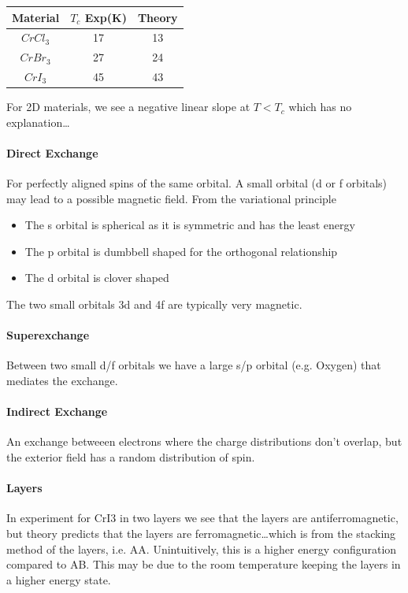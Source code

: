 \documentclass[../main.tex]{subfiles}
\begin{document}
\begin{center}
    \begin{tabular}{c|c|c}
        \hline
        Material & $T_c$ Exp(K) & Theory  \\
        \hline
        $CrCl_3$ & 17 & 13  \\
        $CrBr_3$ & 27 & 24  \\
        $CrI_3$ & 45 & 43 \\
        \hline
    \end{tabular}
\end{center}
For 2D materials, we see a negative linear slope at $T<T_c$ which has no explanation\dots

\paragraph*{Direct Exchange} For perfectly aligned spins of the same orbital. A small orbital (d or f orbitals) may lead to a possible magnetic
field. From the variational principle
\begin{itemize}
    \item The s orbital is spherical as it is symmetric and has the least energy
    \item The p orbital is dumbbell shaped for the orthogonal relationship
    \item The d orbital is clover shaped 
\end{itemize} 
The two small orbitals 3d and 4f are typically very magnetic. 

\paragraph*{Superexchange}
Between two small d/f orbitals we have a large s/p orbital (e.g. Oxygen) that mediates the exchange.

\paragraph*{Indirect Exchange} An exchange betweeen electrons where the charge distributions don't
overlap, but the exterior field has a random distribution of spin.

\paragraph*{Layers}
In experiment for CrI3 in two layers we see that the layers are antiferromagnetic, but theory
predicts that the layers are ferromagnetic\dots which is from the stacking method of the layers,
i.e. AA. Unintuitively, this is a higher energy configuration compared to AB. This may be due to the
room temperature keeping the layers in a higher energy state.
\end{document}
